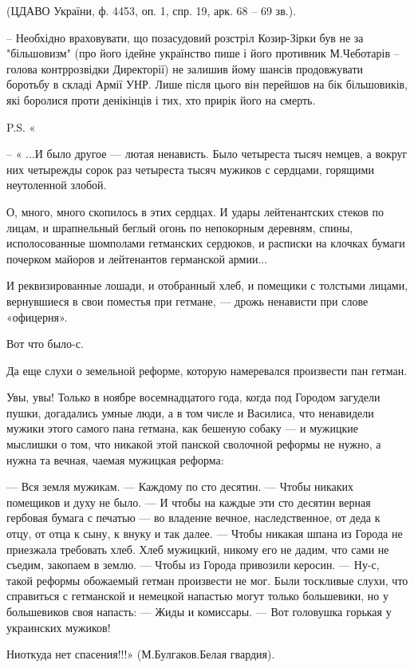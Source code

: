  (ЦДАВО України, ф. 4453, оп. 1, спр. 19, арк. 68 – 69 зв.).

\zzrule

– Необхідно враховувати, що позасудовий розстріл Козир-Зірки був не за
"більшовизм" (про його ідейне українство пише і його противник М.Чеботарів
– голова контррозвідки Директорії) не залишив йому шансів продовжувати
боротьбу в складі Армії УНР. Лише після цього він перейшов на бік
більшовиків, які боролися проти денікінців і тих, хто прирік його на
смерть. 

P.S. «

– « ...И было другое — лютая ненависть. Было четыреста тысяч немцев, а вокруг них
четырежды сорок раз четыреста тысяч мужиков с сердцами, горящими неутоленной
злобой. 

О, много, много скопилось в этих сердцах. И удары лейтенантских стеков по
лицам, и шрапнельный беглый огонь по непокорным деревням, спины,
исполосованные шомполами гетманских сердюков, и расписки на клочках бумаги
почерком майоров и лейтенантов германской армии...

И реквизированные лошади, и отобранный хлеб, и помещики с толстыми лицами,
вернувшиеся в свои поместья при гетмане, — дрожь ненависти при слове
«офицерня».

Вот что было-с.

Да еще слухи о земельной реформе, которую намеревался произвести пан гетман.

Увы, увы! Только в ноябре восемнадцатого года, когда под Городом загудели
пушки, догадались умные люди, а в том числе и Василиса, что ненавидели мужики
этого самого пана гетмана, как бешеную собаку — и мужицкие мыслишки о том, что
никакой этой панской сволочной реформы не нужно, а нужна та вечная, чаемая
мужицкая реформа:

\obeycr
— Вся земля мужикам.
— Каждому по сто десятин.
— Чтобы никаких помещиков и духу не было.
— И чтобы на каждые эти сто десятин верная гербовая бумага с печатью — во владение вечное, наследственное, от деда к отцу, от отца к сыну, к внуку и так далее.
— Чтобы никакая шпана из Города не приезжала требовать хлеб. Хлеб мужицкий, никому его не дадим, что сами не съедим, закопаем в землю.
— Чтобы из Города привозили керосин.
— Ну-с, такой реформы обожаемый гетман произвести не мог.
Были тоскливые слухи, что справиться с гетманской и немецкой напастью могут только большевики, но у большевиков своя напасть:
— Жиды и комиссары.
— Вот головушка горькая у украинских мужиков!
\restorecr

Ниоткуда нет спасения!!!» (М.Булгаков.Белая гвардия).
